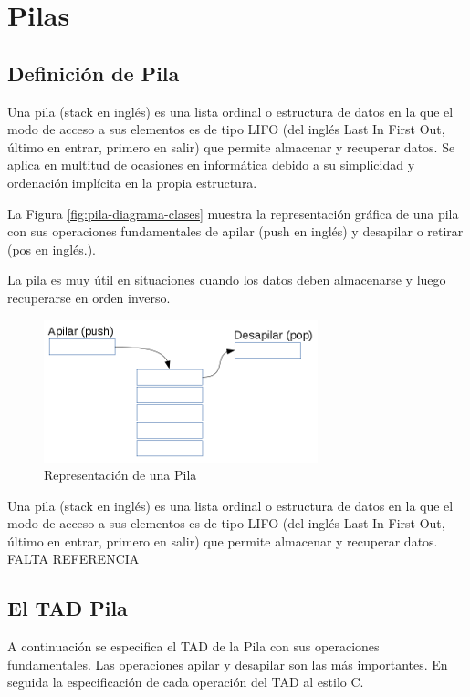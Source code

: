 \chapter{Pilas}

\section{Definición de Pila}
Una pila (stack en inglés) es una lista ordinal o estructura de datos en la que el modo de acceso a sus elementos es de tipo LIFO (del inglés Last In First Out, último en entrar, primero en salir) que permite almacenar y recuperar datos. Se aplica en multitud de ocasiones en informática debido a su simplicidad y ordenación implícita en la propia estructura. 

La Figura  \ref{fig:pila-diagrama-clases} muestra la representación gráfica de una pila con sus operaciones fundamentales de apilar (push en inglés) y desapilar o retirar (pos en inglés.).

La pila es muy útil en situaciones cuando los datos deben almacenarse y luego recuperarse en orden inverso.

\begin{figure}
	\centering
		\includegraphics{images/RepresentacionPila}
	\caption{Representación de una Pila}	
	\label{fig:pila-representacion}
\end{figure}

\begin{definicion}
Una pila (stack en inglés) es una lista ordinal o estructura de datos en la que el modo de acceso a sus elementos es de tipo LIFO (del inglés Last In First Out, último en entrar, primero en salir) que permite almacenar y recuperar datos. FALTA REFERENCIA
\end{definicion}

\section{El TAD Pila}
A continuación se especifica el TAD de la Pila con sus operaciones fundamentales. Las operaciones apilar y desapilar son las más importantes. En seguida la especificación de cada operación del TAD al estilo C.

